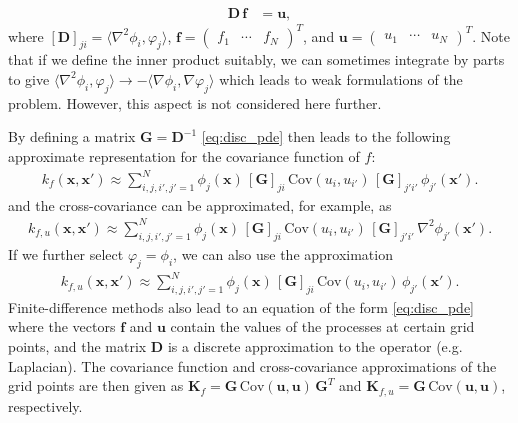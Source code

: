 \documentclass[journal]{IEEEtran}
\begin{document}
%
\begin{equation}
\begin{split}
  \mathbf{D} \, \mathbf{f} &= \mathbf{u},
\end{split}
\label{eq:disc_pde}
\end{equation}
%
where $[\mathbf{D}]_{ji} = \langle \nabla^2 \phi_i, \varphi_j \rangle$, $\mathbf{f} = \begin{pmatrix} f_1 & \cdots & f_N \end{pmatrix}^T$, and $\mathbf{u} = \begin{pmatrix} u_1 & \cdots & u_N  \end{pmatrix}^T$. Note that if we define the inner product suitably, we can sometimes integrate by parts to give $\langle \nabla^2 \phi_i, \varphi_j \rangle \to -\langle \nabla \phi_i, \nabla \varphi_j \rangle$ which leads to weak formulations of the problem. However, this aspect is not considered here further.

By defining a matrix $\mathbf{G} = \mathbf{D}^{-1}$ \eqref{eq:disc_pde} then leads to the following approximate representation for the covariance function of $f$:
%
% 
% 
\begin{equation}
\begin{split}
  k_f(\mathbf{x},\mathbf{x}')
  \approx \sum_{i,j,i',j'=1}^N \phi_j(\mathbf{x}) \, [\mathbf{G}]_{ji} \, \mathrm{Cov}(u_i,u_{i'}) \, 
    [\mathbf{G}]_{j'i'} \, \phi_{j'}(\mathbf{x}').
\end{split}
\end{equation}
%
and the cross-covariance can be approximated, for example, as
%
\begin{equation}
\begin{split}
  k_{f,u}(\mathbf{x},\mathbf{x}')
  \approx \sum_{i,j,i',j'=1}^N \phi_j(\mathbf{x}) \, [\mathbf{G}]_{ji} \, \mathrm{Cov}(u_i,u_{i'}) \, 
    [\mathbf{G}]_{j'i'} \, \nabla^2 \phi_{j'}(\mathbf{x}').
\end{split}
\label{eq:pde_kfu}
\end{equation}
%
If we further select $\varphi_j = \phi_i$, we can also use the approximation
%
\begin{equation}
\begin{split}
  k_{f,u}(\mathbf{x},\mathbf{x}')
  \approx \sum_{i,j,i',j'=1}^N \phi_j(\mathbf{x}) \, [\mathbf{G}]_{ji} \, \mathrm{Cov}(u_i,u_{i'}) \, \phi_{j'}(\mathbf{x}').
\end{split}
\label{eq:pde_kfu2}
\end{equation}
%
Finite-difference methods also lead to an equation of the form \eqref{eq:disc_pde} where the vectors $\mathbf{f}$ and $\mathbf{u}$ contain the values of the processes at certain grid points, and the matrix $\mathbf{D}$ is a discrete approximation to the operator (e.g. Laplacian). The covariance function and cross-covariance approximations of the grid points are then given as $\mathbf{K}_f = \mathbf{G} \, \mathrm{Cov}(\mathbf{u},\mathbf{u}) \, \mathbf{G}^T$ and $\mathbf{K}_{f,u} = \mathbf{G} \, \mathrm{Cov}(\mathbf{u},\mathbf{u})$, respectively.
\end{document}
